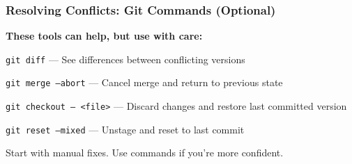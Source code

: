 \documentclass[aspectratio=169]{beamer}
\begin{document}
\begin{frame}
  \frametitle{Resolving Conflicts: Git Commands (Optional)}

  \textbf{These tools can help, but use with care:}

  \vspace{0.5em}
  \texttt{git diff} — See differences between conflicting versions

  \vspace{0.5em}
  \texttt{git merge --abort} — Cancel merge and return to previous state

  \vspace{0.5em}
  \texttt{git checkout -- <file>} — Discard changes and restore last committed version

  \vspace{0.5em}
  \texttt{git reset --mixed} — Unstage and reset to last commit

  \vspace{1em}
  Start with manual fixes. Use commands if you're more confident.
\end{frame}
\end{document}

